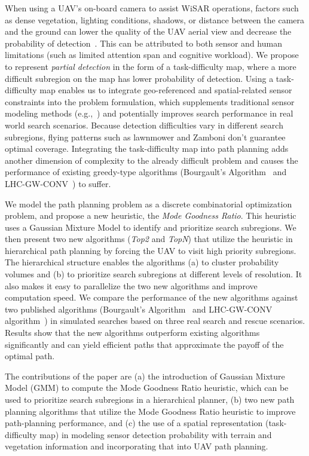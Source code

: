When using a UAV's on-board camera to assist WiSAR operations, factors such as dense vegetation, lighting conditions, shadows, or distance between the camera and the ground can lower the quality of the UAV aerial view and decrease the probability of detection~\cite{Morse2010UAV}. This can be attributed to both sensor and human limitations (such as limited attention span and cognitive workload). We propose to represent \textit{partial detection} in the form of a task-difficulty map, where a more difficult subregion on the map has lower probability of detection. Using a task-difficulty map enables us to integrate geo-referenced and spatial-related sensor constraints into the problem formulation, which supplements traditional sensor modeling methods (e.g.,~\cite{Bourgault2006Optimal}) and potentially improves search performance in real world search scenarios. Because detection difficulties vary in different search subregions, flying patterns such as lawnmower and Zamboni don't guarantee optimal coverage. Integrating the task-difficulty map into path planning adds another dimension of complexity to the already difficult problem and causes the performance of existing greedy-type algorithms (Bourgault's Algorithm~\cite{Bourgault2006Optimal} and LHC-GW-CONV~\cite{Lin2009UAV}) to suffer.

We model the path planning problem as a discrete combinatorial optimization problem, and propose a new heuristic, the \textit{Mode Goodness Ratio}. This heuristic uses a Gaussian Mixture Model to identify and prioritize search subregions. We then present two new algorithms (\textit{Top2} and \textit{TopN}) that utilize the heuristic in hierarchical path planning by forcing the UAV to visit high priority subregions. The hierarchical structure enables the algorithms (a) to cluster probability volumes and (b) to prioritize search subregions at different levels of resolution. It also makes it easy to parallelize the two new algorithms and improve computation speed. We compare the performance of the new algorithms against two published algorithms (Bourgault's Algorithm~\cite{Bourgault2006Optimal} and LHC-GW-CONV algorithm~\cite{Lin2009UAV}) in simulated searches based on three real search and rescue scenarios. Results show that the new algorithms outperform existing algorithms significantly and can yield efficient paths that approximate the payoff of the optimal path.

The contributions of the paper are (a) the introduction of Gaussian Mixture Model (GMM) to compute the Mode Goodness Ratio heuristic, which can be used to prioritize search subregions in a hierarchical planner, (b) two new path planning algorithms that utilize the Mode Goodness Ratio heuristic to improve path-planning performance, and (c) the use of a spatial representation (task-difficulty map) in modeling sensor detection probability with terrain and vegetation information and incorporating that into UAV path planning.


